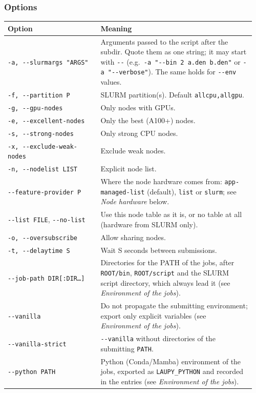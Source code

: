 \documentclass[11pt,a4paper]{article}
\newcommand{\cmd}[1]{\texttt{#1}}
\begin{document}
\subsubsection*{Options}

\begin{longtable}{@{}>{\raggedright}p{0.36\linewidth}>{\raggedright\arraybackslash}p{0.6\linewidth}@{}}
\toprule
Option & Meaning \\
\midrule
\endhead
\cmd{-a, -{}-slurmargs "ARGS"} & Arguments passed to the script after the subdir. Quote them as one string; it may start with \cmd{-{}-} (e.g.\ \cmd{-a "-{}-bin 2 a.den b.den"} or \cmd{-a "-{}-verbose"}). The same holds for \cmd{-{}-env} values. \\
\cmd{-f, -{}-partition P} & SLURM partition(s). Default \cmd{allcpu,allgpu}. \\
\cmd{-g, -{}-gpu-nodes} & Only nodes with GPUs. \\
\cmd{-e, -{}-excellent-nodes} & Only the best (A100+) nodes. \\
\cmd{-s, -{}-strong-nodes} & Only strong CPU nodes. \\
\cmd{-x, -{}-exclude-weak-nodes} & Exclude weak nodes. \\
\cmd{-n, -{}-nodelist LIST} & Explicit node list. \\
\cmd{-{}-feature-provider P} & Where the node hardware comes from: \cmd{app-managed-list} (default), \cmd{list} or \cmd{slurm}; see \emph{Node hardware} below. \\
\cmd{-{}-list FILE}, \cmd{-{}-no-list} & Use this node table as it is, or no table at all (hardware from SLURM only). \\
\cmd{-o, -{}-oversubscribe} & Allow sharing nodes. \\
\cmd{-t, -{}-delaytime S} & Wait S seconds between submissions. \\
\cmd{-{}-job-path DIR[:DIR\ldots]} & Directories for the PATH of the jobs, after \cmd{ROOT/bin}, \cmd{ROOT/script} and the SLURM script directory, which always lead it (see \emph{Environment of the jobs}). \\
\cmd{-{}-vanilla} & Do not propagate the submitting environment; export only explicit variables (see \emph{Environment of the jobs}). \\
\cmd{-{}-vanilla-strict} & \cmd{-{}-vanilla} without directories of the submitting \cmd{PATH}. \\
\cmd{-{}-python PATH} & Python (Conda/Mamba) environment of the jobs, exported as \cmd{LAUPY\_PYTHON} and recorded in the entries (see \emph{Environment of the jobs}). \\

\end{longtable}
\end{document}
